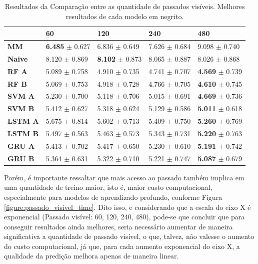 \begin{table}[htbp]
    \begin{tabular*}{\linewidth}{@{\extracolsep{\fill}}lllll}
    \toprule
     & 
    \multicolumn{1}{l}{\textbf{60}} & 
    \multicolumn{1}{l}{\textbf{120}} &
    \multicolumn{1}{l}{\textbf{240}} &
    \multicolumn{1}{l}{\textbf{480}} \\
    \midrule
    \textbf{MM} & \textbf{6.485} $\pm$ 0.627 & 6.836 $\pm$ 0.649 & 7.626 $\pm$ 0.684 & 9.098 $\pm$ 0.740
    \\
    \midrule
    \textbf{Naive} & 8.120 $\pm$ 0.869 & \textbf{8.102} $\pm$ 0.873 & 8.065 $\pm$ 0.887 & 8.026 $\pm$ 0.868 
    \\
    \midrule
    \textbf{RF A} & 5.089 $\pm$ 0.758 & 4.910 $\pm$ 0.735 & 4.741 $\pm$ 0.707 & \textbf{4.569} $\pm$ 0.739 
    \\
    \midrule
    \textbf{RF B} & 5.069 $\pm$ 0.753 & 4.918 $\pm$ 0.728 & 4.766 $\pm$ 0.705 & \textbf{4.610} $\pm$ 0.745 
    \\
    \midrule
    \textbf{SVM A} & 5.230 $\pm$ 0.700 & 5.118 $\pm$ 0.706 & 5.015 $\pm$ 0.691 & \textbf{4.669} $\pm$ 0.736 
    \\
    \midrule
    \textbf{SVM B} & 5.412 $\pm$ 0.627 & 5.318 $\pm$ 0.624 & 5.129 $\pm$ 0.586 & \textbf{5.011} $\pm$ 0.618 
    \\
    \midrule
    \textbf{LSTM A} & 5.675 $\pm$ 0.814 & 5.602 $\pm$ 0.713 & 5.409 $\pm$ 0.750 & \textbf{5.260} $\pm$ 0.769 
    \\
    \midrule
    \textbf{LSTM B} & 5.497 $\pm$ 0.563 & 5.463 $\pm$ 0.573 & 5.343 $\pm$ 0.731 & \textbf{5.220} $\pm$ 0.763 
    \\
    \midrule
    \textbf{GRU A} & 5.413 $\pm$ 0.702 & 5.417 $\pm$ 0.650 & 5.230 $\pm$ 0.610 & \textbf{5.191} $\pm$ 0.742 
    \\
    \midrule
    \textbf{GRU B} & 5.364 $\pm$ 0.631 & 5.322 $\pm$ 0.710 & 5.221 $\pm$ 0.747 & \textbf{5.087} $\pm$ 0.679
    \\
    \bottomrule
    \end{tabular*}
    \label{table:res_past}
    \caption{Resultados da Comparação entre as quantidade de passados visíveis. Melhores resultados de cada modelo em negrito.}
\end{table}
 

Porém, é importante ressaltar que mais acesso ao passado também implica em uma quantidade de treino maior, isto é, maior custo computacional, especialmente para modelos de aprendizado profundo, conforme Figura \ref{figure:passado_visivel_time}. Dito isso, e considerando que a escala do eixo X é exponencial (Passado visível: 60, 120, 240, 480), pode-se que concluir que para conseguir resultados ainda melhores, seria necessário aumentar de maneira significativa a quantidade de passado visível, o que, talvez, não valesse o aumento do custo computacional, já que, para cada aumento exponencial do eixo X, a qualidade da predição melhora apenas de maneira linear. 

